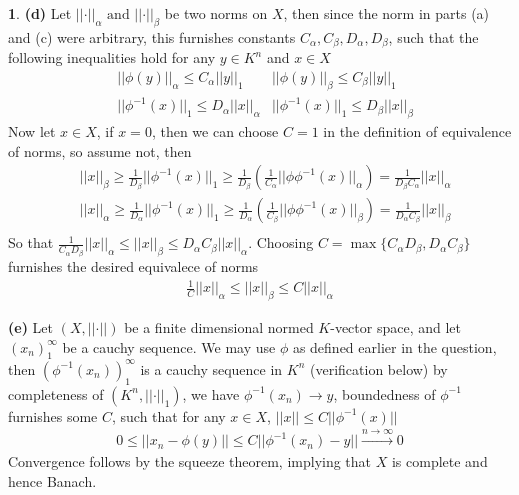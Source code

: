 \documentclass[10.5pt]{article}
\theoremstyle{definition}
\newtheorem{pb}{}
\newcommand{\set}[1]{\{#1\}}
\newcommand{\norm}[1]{\lvert\lvert#1\rvert\rvert}
\newcommand{\tand}{\text{ and }}
\begin{document}
\begin{pb}
        \textbf{(d)} Let \(\norm{\cdot}_\alpha \tand \norm{\cdot}_\beta\) be two norms on \(X\), then since the norm in parts (a) and (c) were arbitrary, this furnishes constants \(C_\alpha, C_\beta, D_\alpha, D_\beta\), such that the following inequalities hold for any \(y \in K^n\) and \(x \in X\)
        \begin{align*}
            &\norm{\phi(y)}_\alpha \leq C_\alpha\norm{y}_1
            &\norm{\phi(y)}_\beta \leq C_\beta\norm{y}_1\\
            &\norm{\phi^{-1}(x)}_1 \leq D_\alpha\norm{x}_\alpha
            &\norm{\phi^{-1}(x)}_1 \leq D_\beta\norm{x}_\beta
        \end{align*}
        Now let \(x \in X\), if \(x = 0\), then we can choose \(C = 1\) in the definition of equivalence of norms, so assume not, then
        \begin{align*}
            &\norm{x}_\beta \geq \frac{1}{D_\beta}\norm{\phi^{-1}(x)}_1 \geq \frac{1}{D_\beta}\left(\frac{1}{C_\alpha}\norm{\phi\phi^{-1}(x)}_\alpha\right) = \frac{1}{D_\beta C_\alpha}\norm{x}_\alpha \\
            &\norm{x}_\alpha \geq \frac{1}{D_\alpha}\norm{\phi^{-1}(x)}_1 \geq \frac{1}{D_\alpha}\left(\frac{1}{C_\beta}\norm{\phi\phi^{-1}(x)}_\beta\right) = \frac{1}{D_\alpha C_\beta}\norm{x}_\beta \\
        \end{align*}
        So that \(\frac{1}{C_\alpha D_\beta}\norm{x}_\alpha \leq \norm{x}_\beta \leq D_\alpha C_\beta\norm{x}_\alpha\).
        Choosing \(C = \max\set{C_\alpha D_\beta, D_\alpha C_\beta}\) furnishes the desired equivalece of norms
        \begin{align*}
            \frac{1}{C}\norm{x}_\alpha \leq \norm{x}_\beta \leq C\norm{x}_\alpha
        \end{align*}

        \textbf{(e)} Let \((X,\norm{\cdot})\) be a finite dimensional normed \(K\)-vector space, and let \((x_n)_1^\infty\) be a cauchy sequence. We may use \(\phi\) as defined earlier in the question, then \((\phi^{-1}(x_n))_1^\infty\) is a cauchy sequence in \(K^n\) (verification below) by completeness of \((K^n,\norm{\cdot}_1)\), we have \(\phi^{-1}(x_n) \to y\), boundedness of \(\phi^{-1}\) furnishes some \(C\), such that for any \(x \in X\), \(\norm{x} \leq C\norm{\phi^{-1}(x)}\)
        \begin{align*}
            0 \leq \norm{x_n - \phi(y)} \leq C\norm{\phi^{-1}(x_n) - y} \overset{n \to \infty}{\longrightarrow} 0
        \end{align*}
        Convergence follows by the squeeze theorem, implying that \(X\) is complete and hence Banach.


\end{pb}
\end{document}
